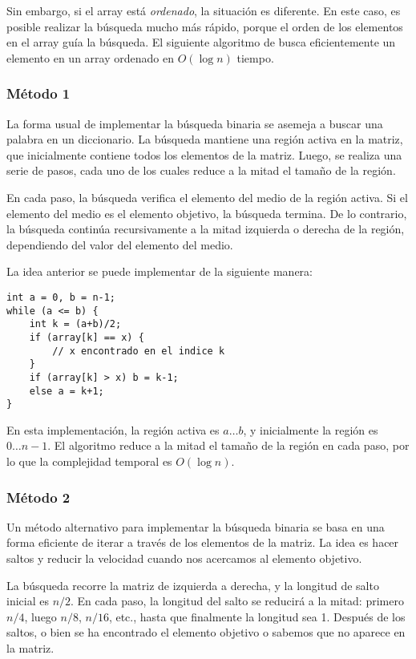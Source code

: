 Sin embargo, si el array está \emph{ordenado},
la situación es diferente.
En este caso, es posible realizar la
búsqueda mucho más rápido, porque el orden de los
elementos en el array guía la búsqueda.
El siguiente algoritmo de 
busca eficientemente un elemento en un array ordenado
en $O(\log n)$ tiempo.

\subsubsection{Método 1}
La forma usual de implementar la búsqueda binaria
se asemeja a buscar una palabra en un diccionario.
La búsqueda mantiene una región activa en la matriz,
que inicialmente contiene todos los elementos de la matriz.
Luego, se realiza una serie de pasos,
cada uno de los cuales reduce a la mitad el tamaño de la región.

En cada paso, la búsqueda verifica el elemento del medio
de la región activa.
Si el elemento del medio es el elemento objetivo,
la búsqueda termina.
De lo contrario, la búsqueda continúa recursivamente
a la mitad izquierda o derecha de la región,
dependiendo del valor del elemento del medio.

La idea anterior se puede implementar de la siguiente manera:
\begin{lstlisting}
int a = 0, b = n-1;
while (a <= b) {
    int k = (a+b)/2;
    if (array[k] == x) {
        // x encontrado en el indice k
    }
    if (array[k] > x) b = k-1;
    else a = k+1;
}
\end{lstlisting}

En esta implementación, la región activa es $a \ldots b$,
y inicialmente la región es $0 \ldots n-1$.
El algoritmo reduce a la mitad el tamaño de la región en cada paso,
por lo que la complejidad temporal es $O(\log n)$.

\subsubsection{Método 2}

Un método alternativo para implementar la búsqueda binaria
se basa en una forma eficiente de iterar a través de
los elementos de la matriz.
La idea es hacer saltos y reducir la velocidad
cuando nos acercamos al elemento objetivo.

La búsqueda recorre la matriz de izquierda a
derecha, y la longitud de salto inicial es $n/2$.
En cada paso, la longitud del salto se reducirá a la mitad:
primero $n/4$, luego $n/8$, $n/16$, etc., hasta
que finalmente la longitud sea 1.
Después de los saltos, o bien se ha encontrado el elemento objetivo
o sabemos que no aparece en la matriz.

